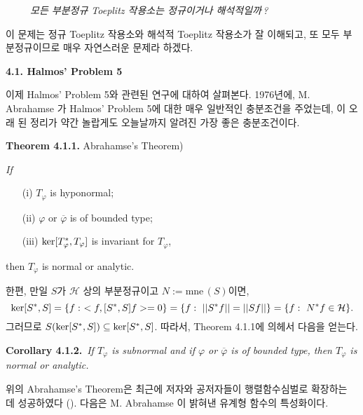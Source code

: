 \documentclass[12pt,a4paper,2sided]{article}
\begin{document}
\vspace{.2 cm}\label{4.1.1}\ \ \ \ \ {\it 모든 부분정규 Toeplitz
작용소는 정규이거나 해석적일까\,?}

\vspace{.2 cm}  이 문제는 정규 Toeplitz 작용소와 해석적 Toeplitz
작용소가 잘 이해되고, 또 모두 부분정규이므로 매우 자연스러운 문제라
하겠다.

\vspace{.2 cm}

\newpage{}


\vspace{.8 cm}

{\bf 4.1. Halmos' Problem 5}

\vspace{0.3cm} 이제 Halmos' Problem 5와 관련된 연구에 대하여
살펴본다. 1976년에, M. Abrahamse \cite{Ab}가 Halmos' Problem 5에
대한 매우 일반적인 충분조건을 주었는데, 이 오래 된 정리가 약간
놀랍게도 오늘날까지 알려진 가장 좋은 충분조건이다.

\vspace{0.3cm} {\bf Theorem 4.1.1.} Abrahamse's Theorem) {\rm
\cite{Ab}} {\sl If
\begin{itemize}
\item[{\rm (i)}] $T_{\varphi}$ is hyponormal;
\item[{\rm (ii)}] $\varphi$ or $\overline\varphi$ is of bounded type;
\item[{\rm (iii)}] ${\rm ker}[T_{\varphi}^*,T_{\varphi}]$ is invariant for $T_{\varphi}$,
\end{itemize}
then $T_{\varphi}$ is normal or analytic.}

\vspace{0.3cm} 한편, 만일 $S$가 $\mathcal H$ 상의 부분정규이고
$N:=\mbox{mne}\,(S)$이면,
$$
{\rm ker}[S^*,S]=\{ f:\ <f, [S^*,S]f>=0\}=\{ f:\ ||S^*f||=||Sf||\}=\{ f:\ N^{*}f\in\mathcal{H}\}.
$$
그러므로 $S({\rm ker}[S^*,S])\subseteq {\rm ker}[S^*,S]$. 따라서,
Theorem 4.1.1에 의헤서 다음을 얻는다.

\vspace{0.3cm} {\bf Corollary 4.1.2.}\ {\sl If $T_{\varphi}$ is
subnormal and if $\varphi$ or $\overline\varphi$ is of bounded type,
then $T_{\varphi}$ is normal or analytic.} \vspace{0.3cm}

위의 Abrahamse's Theorem은 최근에 저자와 공저자들이 행렬함수심벌로
확장하는 데 성공하였다 (\cite{CHL2}). 다음은 M. Abrahamse
\cite{Ab}이  밝혀낸 유계형 함수의 특성화이다.
\end{document}
